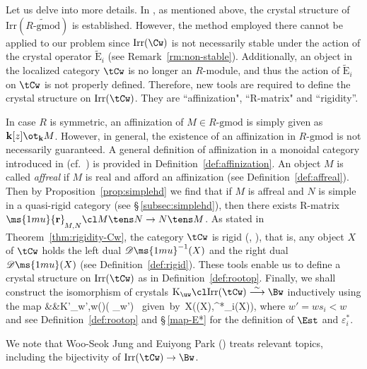 \documentclass[12pt,leqno]{amsart}%
\theoremstyle{plain}
\theoremstyle{definition}
\newcommand{\Z}{\ms{2mu}{\mathbb Z}}
\newcommand{\D}{\mathscr{D}\ms{1mu}}
\newcommand{\gmod}{\text{-}\mathrm{gmod}}
\newcommand{\catC}{ \mathscr{C}}  	%
\newcommand{\tE}{\widetilde{\mathrm{E}}} 		%
\newcommand{\ep}{\varepsilon}  		%
\newcommand{\rmat}[1]{\ms{1mu}{\mathbf{r}}_%
{\mspace{-2mu}\raisebox{-.6ex}{${\scriptstyle{#1}}$}}}
\newcommand{\Irr}{\mathrm{Irr}}
\numberwithin{equation}{section}
\begin{document}
Let us delve into more details.
In \cite{N2}, as mentioned above, the crystal structure of $\Irr(\widetilde{R\gmod})$
is established.
However, the method employed there cannot be applied to our problem since 
 $\Irr(\Cw)$  is not  necessarily stable under the action of the 
 crystal operator $\tE_i$ (see Remark~\ref{rm:non-stable}). Additionally,  an object in the localized category $\tCw$ is no longer an $R$-module,
and thus the action of  $\tE_i$  on $\tCw$ is not properly defined. 
Therefore,  new tools are required to define the crystal structure on $\Irr(\tCw)$.
 They  are ``affinization", ``R-matrix" and ``rigidity''.

%

In case $R$ is symmetric, an affinization of $M\in R\gmod$ is simply given as 
${\bf k}[z]\ot_{\bf  k}M$. However, in general, the existence of an affinization in $R\gmod$ 
is not necessarily guaranteed. A general definition of affinization in
a monoidal category
introduced in \cite{ref2} (cf.\ \cite{KP18}) is provided in Definition~\ref{def:affinization}.
An object $M$ is called {\em affreal} if $M$ is real and afford an affinization
(see Definition~\ref{def:affreal}). Then by Proposition~\ref{prop:simplehd}
we find that if $M$ is affreal and $N$ is simple in a
quasi-rigid category (see \S\,\ref{subsec:simplehd}), then 
there exists R-matrix  $\rmat{M,N}\cl M\tens N\to N\tens M$.
As stated in Theorem~\ref{thm:rigidity-Cw},
the category $\tCw$ is rigid (\cite{KKOP21}, \cite{KKOP22}), 
that is, any object $X$ of $\tCw$ holds the left dual 
$\D^{-1}(X)$ and the right dual $\D(X)$ (see Definition~\ref{def:rigid}).
These tools enable us to define a crystal structure on $\Irr(\tCw)$ as in Definition~\ref{def:rootop}. Finally, we shall construct the isomorphism of crystals
${\rm K}_{\uw}\cl\Irr(\tCw)\overset{\sim}{\longrightarrow}\Bw$ inductively using the map
\eqn
&&{\rm K'}_{w',w}\cl \Irr(\tCw)\to \Irr(\tilde\catC_{w'})\times \Z\quad
\hbox{ given by }\quad X\mapsto  (\Est(X),\eps^*_i(X)),
\eneqn
where $w'=ws_i<w$ and  see Definition~\ref{def:rootop} and \S\,\ref{map-E*} for the definition of
$\Est$ and $\ep^*_i$.

We note that Woo-Seok Jung and Euiyong Park
(\cite{JP}) treats relevant topics,
including the bijectivity of $\Irr(\tCw)\to \Bw$.
\end{document}
